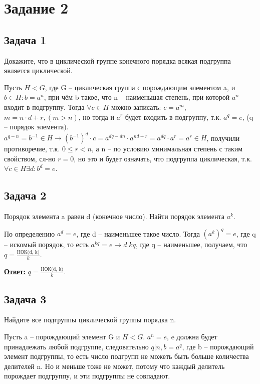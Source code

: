 \documentclass[a4paper,14pt]{article} %
\begin{document}

\section{Задание 2}
\subsection{Задача 1}
Докажите, что в циклической группе конечного порядка всякая подгруппа является циклической.

Пусть $H < G$, где G -- циклическая группа с порождающим элементом a, и $b \in H : b = a^n$, при чём b такое, что n -- наименьшая степень, при которой $a^n$ входит в подгруппу.
Тогда $\forall c \in H$ можно записать: $c = a^m$, $m = n \cdot d + r, (m > n)$, но тогда и $a^r$ будет входить в подгруппу, т.к. $a^q = e$, (q -- порядок элемента).
$a^{q-n} = b^{-1} \in H \longrightarrow (b^{-1})^d \cdot c = a^{dq - dn} \cdot a^{nd+r} = a^{dq} \cdot a^r = a^r \in H$, получили противоречие, 
т.к. $0 \leq r < n$, а n -- по условию минимальная степень с таким свойством, сл-но $r = 0$, 
но это и будет означать, что подгруппа циклическая, т.к. $\forall c \in H \exists d : b^d = e$.

\subsection{Задача 2}
Порядок элемента a равен d (конечное число). Найти порядок элемента $a^k$.

По определению $a^d = e$, где d -- наименьшее такое число.
Тогда $(a^k)^q = e$, где q -- искомый порядок, то есть $a^{kq} = e \longrightarrow d | kq$, 
где q -- наименьшее, получаем, что $q = \frac{\text{НОК(d, k)}}{k}$.

\underline{\textbf{Ответ:}} $q = \frac{\text{НОК(d, k)}}{k}$.

\subsection{Задача 3}
Найдите все подгруппы циклической группы порядка n.

Пусть a -- порождающий элемент G и $H < G$. $a^n = e$, e должна будет принадлежать любой подгруппе,
следовательно $q | n, b = a^q$, где b -- порождающий элемент подгруппы, то есть число подгрупп не можеть быть больше количества делителей n.
Но и меньше тоже не может, потому что каждый делитель порождает подгруппу, и эти подгруппы не совпадают.
\end{document}
